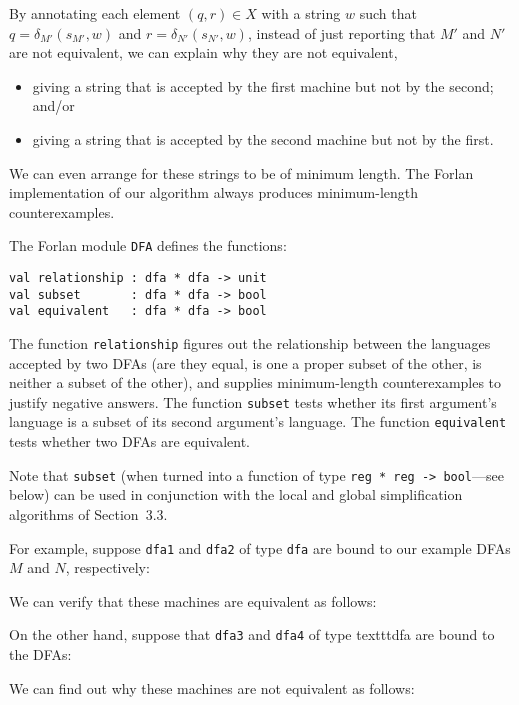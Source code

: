 By annotating each element $(q,r)\in X$ with a string $w$ such that
$q=\delta_{M'}(s_{M'},w)$ and $r=\delta_{N'}(s_{N'},w)$, instead of
just reporting that $M'$ and $N'$ are not equivalent, we can
explain why they are not equivalent,
\begin{itemize}
\item giving a string that is accepted by the first machine but not by
  the second; and/or

\item giving a string that is accepted by the second machine but not
  by the first.
\end{itemize}
We can even arrange for these strings to be of minimum length.
The Forlan implementation of our algorithm always produces minimum-length
counterexamples.

The Forlan module \texttt{DFA} defines the functions:
\begin{verbatim}
val relationship : dfa * dfa -> unit
val subset       : dfa * dfa -> bool
val equivalent   : dfa * dfa -> bool
\end{verbatim}
The function \texttt{relationship} figures out the relationship
between the languages accepted by two DFAs (are they equal, is one a
proper subset of the other, is neither a subset of the other), and
supplies minimum-length counterexamples to justify negative answers.
The function \texttt{subset} tests whether its first argument's
language is a subset of its second argument's language.
The function \texttt{equivalent} tests whether two DFAs are
equivalent.

Note that \texttt{subset} (when turned into a function of type
\texttt{reg~*~reg~->~bool}---see below) can be used in conjunction
with the local and global simplification algorithms of Section~3.3.

For example, suppose \texttt{dfa1} and \texttt{dfa2} of type \texttt{dfa} are
bound to our example DFAs $M$ and $N$, respectively:
\begin{center}

\end{center}
We can verify that these machines are equivalent as follows:


On the other hand, suppose that \texttt{dfa3} and \texttt{dfa4} of type
texttt{dfa} are bound to the DFAs:
\begin{center}

\end{center}
We can find out why these machines are not equivalent as follows:


